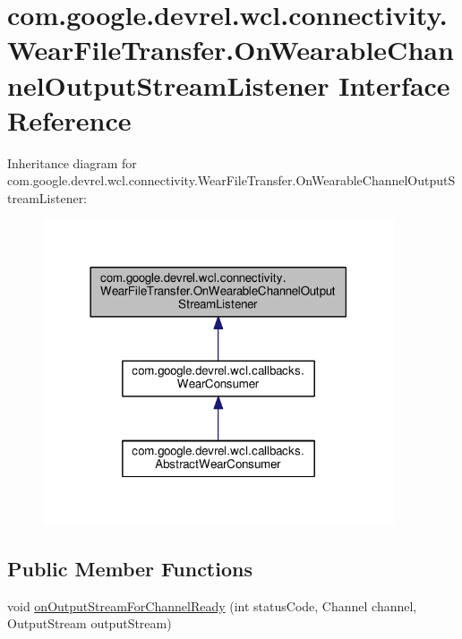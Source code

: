\hypertarget{interfacecom_1_1google_1_1devrel_1_1wcl_1_1connectivity_1_1WearFileTransfer_1_1OnWearableChannelOutputStreamListener}{}\section{com.\+google.\+devrel.\+wcl.\+connectivity.\+Wear\+File\+Transfer.\+On\+Wearable\+Channel\+Output\+Stream\+Listener Interface Reference}
\label{interfacecom_1_1google_1_1devrel_1_1wcl_1_1connectivity_1_1WearFileTransfer_1_1OnWearableChannelOutputStreamListener}


Inheritance diagram for com.\+google.\+devrel.\+wcl.\+connectivity.\+Wear\+File\+Transfer.\+On\+Wearable\+Channel\+Output\+Stream\+Listener\+:\nopagebreak
\begin{figure}[H]
\begin{center}
\leavevmode
\includegraphics[width=294pt]{d5/d7c/interfacecom_1_1google_1_1devrel_1_1wcl_1_1connectivity_1_1WearFileTransfer_1_1OnWearableChanneld70b9d7138a105aaeef3a617c387a1af}
\end{center}
\end{figure}
\subsection*{Public Member Functions}
\begin{DoxyCompactItemize}
\item 
void \hyperlink{interfacecom_1_1google_1_1devrel_1_1wcl_1_1connectivity_1_1WearFileTransfer_1_1OnWearableChannelOutputStreamListener_abcb9123c27d9ece5365b99571a708f60}{on\+Output\+Stream\+For\+Channel\+Ready} (int status\+Code, Channel channel, Output\+Stream output\+Stream)
\end{DoxyCompactItemize}


